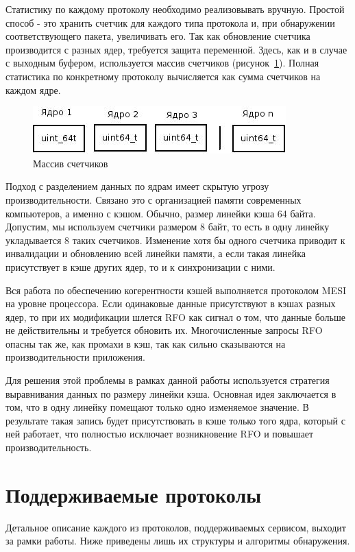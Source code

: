 Статистику по каждому протоколу необходимо реализовывать вручную. Простой способ - это хранить счетчик для каждого типа протокола и, при обнаружении соответствующего пакета, увеличивать его. Так как обновление счетчика производится с разных ядер, требуется защита переменной. Здесь, как и в случае с выходным буфером, используется массив счетчиков (рисунок~\ref{pic:counters}). Полная статистика по конкретному протоколу вычисляется как сумма счетчиков на каждом ядре.
\begin{figure}
\centering
\includegraphics[scale=0.6]{pictures/counters}
\caption{Массив счетчиков}
\label{pic:counters}
\end{figure}

Подход с разделением данных по ядрам имеет скрытую угрозу производительности. Связано это с организацией памяти современных компьютеров, а именно с кэшом. Обычно, размер линейки кэша 64 байта. Допустим, мы используем счетчики размером 8 байт, то есть в одну линейку укладывается 8 таких счетчиков. Изменение хотя бы одного счетчика приводит к инвалидации и обновлению всей линейки памяти, а если такая линейка присутствует в кэше других ядер, то и к синхронизации с ними.

Вся работа по обеспечению когерентности кэшей выполняется протоколом MESI на уровне процессора. Если одинаковые данные присутствуют в кэшах разных ядер, то при их модификации шлется RFO как сигнал о том, что данные больше не действительны и требуется обновить их. Многочисленные запросы RFO опасны так же, как промахи в кэш, так как сильно сказываются на производительности приложения.

Для решения этой проблемы в рамках данной работы используется стратегия выравнивания данных по размеру линейки кэша. Основная идея заключается в том, что в одну линейку помещают только одно изменяемое значение. В результате такая запись будет присутствовать в кэше только того ядра, который с ней работает, что полностью исключает возникновение RFO и повышает производительность.

\section{Поддерживаемые протоколы}
Детальное описание каждого из протоколов, поддерживаемых сервисом, выходит за рамки работы. Ниже приведены лишь их структуры и алгоритмы обнаружения.

